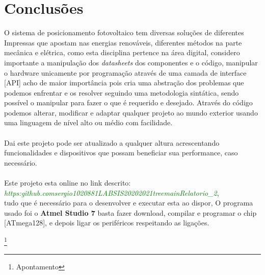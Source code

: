 \newpage
\section{Conclusões}
\qquad O sistema de posicionamento fotovoltaico tem diversas soluções de diferentes Impressas que apostam nas energias renováveis, diferentes métodos na parte mecânica e elétrica, como esta disciplina pertence na área digital, considero importante a manipulação dos {\it datasheets} dos componentes e o código, manipular o hardware unicamente por programação através de uma camada de interface [API] acho de maior importância pois cria uma abstração dos problemas que podemos enfrentar e os resolver seguindo uma metodologia sintática, sendo possível o manipular para fazer o que é requerido e desejado. Através do código podemos alterar, modificar e adaptar qualquer projeto ao mundo exterior usando uma linguagem de nível alto ou médio com facilidade.\\
\\
Dai este projeto pode ser atualizado a qualquer altura acrescentando funcionalidades e dispositivos que possam beneficiar sua performance, caso necessário.\\
\\
Este projeto esta online no link descrito: \\ {\it \textcolor{green}{https:\/\/github.com\/sergio1020881\/LABSIS20202021\/tree\/main\/Relatorio\_2}},\\
tudo que é necessário para o desenvolver e executar esta ao dispor, O programa usado foi o {\bf Atmel Studio 7} basta fazer download, compilar e programar o chip [ATmega128], e depois ligar os periféricos respeitando as ligações.
\newpage
\listoffigures
\cite{*}

\newpage
\footnote{Apontamento}

